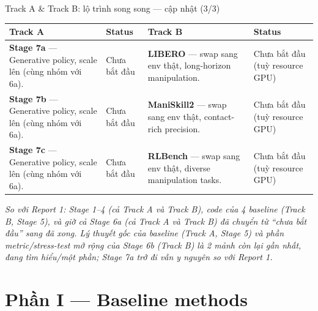 \documentclass[aspectratio=169]{beamer}
\newcommand{\good}[1]{\textcolor{green!40!black}{#1}}
\newcommand{\wip}[1]{\textcolor{orange!80!black}{#1}}
\begin{document}
\begin{frame}[t,shrink=8]{Track A \& Track B: lộ trình song song --- cập nhật (3/3)}
\footnotesize
\begin{tabularx}{\textwidth}{|>{\raggedright\arraybackslash}p{}|>{\centering\arraybackslash}p{}|>{\raggedright\arraybackslash}p{}|>{\centering\arraybackslash}p{}|}
\hline
\textbf{Track A} & \textbf{Status} & \textbf{Track B} & \textbf{Status} \\
\hline
\textbf{Stage 7a} --- Generative policy, scale lên (cùng nhóm với 6a). &
Chưa bắt đầu &
\textbf{LIBERO} --- swap sang env thật, long-horizon manipulation. &
Chưa bắt đầu (tuỳ resource GPU) \\
\hline
\textbf{Stage 7b} --- Generative policy, scale lên (cùng nhóm với 6a). &
Chưa bắt đầu &
\textbf{ManiSkill2} --- swap sang env thật, contact-rich precision. &
Chưa bắt đầu (tuỳ resource GPU) \\
\hline
\textbf{Stage 7c} --- Generative policy, scale lên (cùng nhóm với 6a). &
Chưa bắt đầu &
\textbf{RLBench} --- swap sang env thật, diverse manipulation tasks. &
Chưa bắt đầu (tuỳ resource GPU) \\
\hline
\end{tabularx}
\vspace{4pt}
\footnotesize\textit{So với Report 1: Stage 1--4 (cả Track A và Track B), code của 4 baseline (Track B, Stage 5), và giờ cả Stage 6a (cả Track A và Track B) đã chuyển từ ``chưa bắt đầu'' sang \good{đã xong}. Lý thuyết gốc của baseline (Track A, Stage 5) và phần metric/stress-test mở rộng của Stage 6b (Track B) là 2 mảnh còn lại gần nhất, đang \wip{tìm hiểu}/\wip{một phần}; Stage 7a trở đi vẫn y nguyên so với Report 1.}
\end{frame}

\section{Phần I --- Baseline methods}
\end{document}
